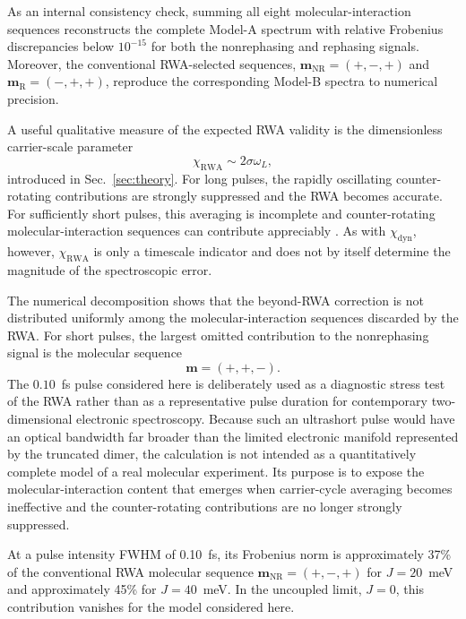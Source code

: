 As an internal consistency check, summing all eight
molecular-interaction sequences reconstructs the complete Model-A
spectrum with relative Frobenius discrepancies below $10^{-15}$ for
both the nonrephasing and rephasing signals. Moreover, the conventional
RWA-selected sequences, $\mathbf{m}_{\mathrm{NR}}=(+,-,+)$ and
$\mathbf{m}_{\mathrm{R}}=(-,+,+)$, reproduce the corresponding Model-B
spectra to numerical precision.

A useful qualitative measure of the expected RWA validity is the
dimensionless carrier-scale parameter
%
\begin{equation}
\chi_{\mathrm{RWA}}
\sim
2\sigma\omega_L ,
\label{eq:dimer_chi_rwa}
\end{equation}
%
introduced in Sec.~\ref{sec:theory}.
For long pulses, the rapidly oscillating counter-rotating contributions
are strongly suppressed and the RWA becomes accurate. For sufficiently
short pulses, this averaging is incomplete and counter-rotating
molecular-interaction sequences can contribute appreciably
\cite{Smallwood2017FinitePulse,Tan2026RWA}.
As with $\chi_{\mathrm{dyn}}$, however,
$\chi_{\mathrm{RWA}}$ is only a timescale indicator and does not by
itself determine the magnitude of the spectroscopic error.

The numerical decomposition shows that the beyond-RWA correction is
not distributed uniformly among the molecular-interaction sequences
discarded by the RWA. For short pulses, the largest omitted
contribution to the nonrephasing signal is the molecular sequence
%
\begin{equation}
\mathbf{m}=(+,+,-).
\end{equation}
%
The $0.10$~fs pulse considered here is deliberately used
as a diagnostic stress test of the RWA rather than as
a representative pulse duration for contemporary
two-dimensional electronic spectroscopy. Because such an ultrashort
pulse would have an optical bandwidth far broader than the limited
electronic manifold represented by the truncated dimer, the
calculation is not intended as a quantitatively complete model of a
real molecular experiment. Its purpose is to expose the
molecular-interaction content that emerges when carrier-cycle
averaging becomes ineffective and the counter-rotating contributions
are no longer strongly suppressed.

At a pulse intensity FWHM of 0.10~fs, its Frobenius norm is
approximately 37\% of the conventional RWA molecular sequence
$\mathbf{m}_{\mathrm{NR}}=(+,-,+)$ for $J=20$~meV and approximately
45\% for $J=40$~meV. In the uncoupled limit, $J=0$, this contribution
vanishes for the model considered here.

